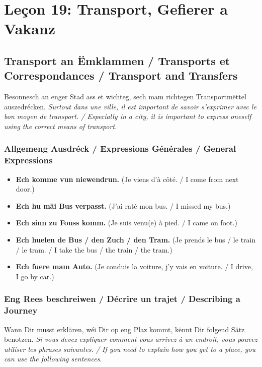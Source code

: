 \chapter{Leçon 19: Transport, Gefierer a Vakanz}

\section{Transport an Ëmklammen / Transports et Correspondances / Transport and Transfers}

Besonnesch an enger Stad ass et wichteg, sech mam richtegen Transportmëttel auszedrécken. \textit{Surtout dans une ville, il est important de savoir s'exprimer avec le bon moyen de transport. / Especially in a city, it is important to express oneself using the correct means of transport.}

\subsection{Allgemeng Ausdréck / Expressions Générales / General Expressions}
\begin{itemize}
    \item \textbf{Ech komme vun niewendrun.} (Je viens d'à côté. / I come from next door.)
    \item \textbf{Ech hu mäi Bus verpasst.} (J'ai raté mon bus. / I missed my bus.)
    \item \textbf{Ech sinn zu Fouss komm.} (Je suis venu(e) à pied. / I came on foot.)
    \item \textbf{Ech huelen de Bus / den Zuch / den Tram.} (Je prends le bus / le train / le tram. / I take the bus / the train / the tram.)
    \item \textbf{Ech fuere mam Auto.} (Je conduis la voiture, j'y vais en voiture. / I drive, I go by car.)
\end{itemize}

\subsection{Eng Rees beschreiwen / Décrire un trajet / Describing a Journey}
Wann Dir musst erklären, wéi Dir op eng Plaz kommt, kënnt Dir folgend Sätz benotzen. \textit{Si vous devez expliquer comment vous arrivez à un endroit, vous pouvez utiliser les phrases suivantes. / If you need to explain how you get to a place, you can use the following sentences.}

